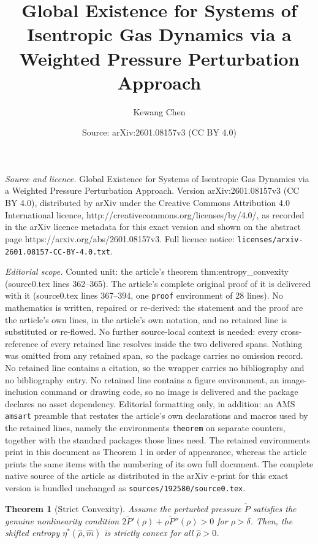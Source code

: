 \documentclass[10pt,a4paper]{amsart}
\title{Global Existence for Systems of Isentropic Gas Dynamics via a Weighted Pressure Perturbation Approach}
\author{Kewang Chen}
\date{Source: arXiv:2601.08157v3 (CC BY 4.0)}
\newtheorem{theorem}{Theorem}
\begin{document}
\maketitle

\noindent\emph{Source and licence.} Global Existence for Systems of Isentropic Gas Dynamics via a Weighted Pressure Perturbation Approach. Version arXiv:2601.08157v3 (CC BY 4.0), distributed by arXiv under the Creative Commons Attribution 4.0 International licence, http://creativecommons.org/licenses/by/4.0/, as recorded in the arXiv licence metadata for this exact version and shown on the abstract page https://arxiv.org/abs/2601.08157v3. Full licence notice: \texttt{licenses/arxiv-2601.08157-CC-BY-4.0.txt}.\par\smallskip

\noindent\textit{Editorial scope.} Counted unit: the article's theorem thm:entropy\_convexity (source0.tex lines 362--365). The article's complete original proof of it is delivered with it (source0.tex lines 367--394, one \texttt{proof} environment of 28 lines). No mathematics is written, repaired or re-derived: the statement and the proof are the article's own lines, in the article's own notation, and no retained line is substituted or re-flowed.  No further source-local context is needed: every cross-reference of every retained line resolves inside the two delivered spans.  Nothing was omitted from any retained span, so the package carries no omission record.  No retained line contains a citation, so the wrapper carries no bibliography and no bibliography entry.  No retained line contains a figure environment, an image-inclusion command or drawing code, so no image is delivered and the package declares no asset dependency.  Editorial formatting only, in addition: an AMS \texttt{amsart} preamble that restates the article's own declarations and macros used by the retained lines, namely the environments \texttt{theorem} on separate counters, together with the standard packages those lines need.  The retained environments print in this document as Theorem 1 in order of appearance, whereas the article prints the same items with the numbering of its own full document.  The complete native source of the article as distributed in the arXiv e-print for this exact version is bundled unchanged as \texttt{sources/192580/source0.tex}.
\begin{theorem}[Strict Convexity]
\label{thm:entropy_convexity}
Assume the perturbed pressure $\tilde{P}$ satisfies the genuine nonlinearity condition $2\tilde{P}'(\rho) + \rho\tilde{P}''(\rho) > 0$ for $\rho > \delta$. Then, the shifted entropy $\eta^*(\hat{\rho}, \hat{m})$ is strictly convex for all $\hat{\rho} > 0$.
\end{theorem}
\end{document}
